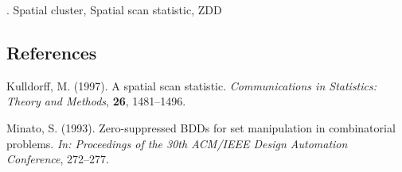 \documentclass[12pt]{article}
\begin{document}
.
Spatial cluster, Spatial scan statistic, ZDD


%        
%
%        

\subsection*{References}

\begin{description}

\item
Kulldorff, M. (1997).
A spatial scan statistic.
\textit{Communications in Statistics: Theory and Methods}, 
\textbf{26}, 1481--1496.

\item
Minato, S. (1993).
Zero-suppressed BDDs for set manipulation in combinatorial problems.
\textit{In: Proceedings of the 30th ACM/IEEE Design Automation Conference}, 272--277.

\end{description}
\end{document}
